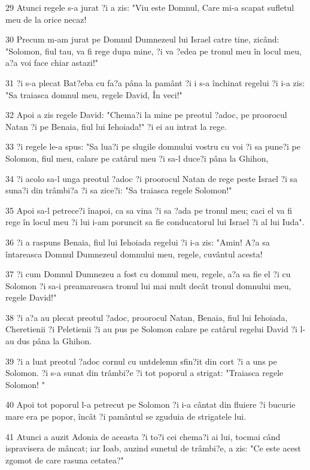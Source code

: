 \par 29 Atunci regele s-a jurat ?i a zis: "Viu este Domnul, Care mi-a scapat sufletul meu de la orice necaz!
\par 30 Precum m-am jurat pe Domnul Dumnezeul lui Israel catre tine, zicând: "Solomon, fiul tau, va fi rege dupa mine, ?i va ?edea pe tronul meu în locul meu, a?a voi face chiar astazi!"
\par 31 ?i s-a plecat Bat?eba cu fa?a pâna la pamânt ?i i s-a închinat regelui ?i i-a zis: "Sa traiasca domnul meu, regele David, În veci!"
\par 32 Apoi a zis regele David: "Chema?i la mine pe preotul ?adoc, pe proorocul Natan ?i pe Benaia, fiul lui Iehoiada!" ?i ei au intrat la rege.
\par 33 ?i regele le-a spus: "Sa lua?i pe slugile domnului vostru cu voi ?i sa pune?i pe Solomon, fiul meu, calare pe catârul meu ?i sa-l duce?i pâna la Ghihon,
\par 34 ?i acolo sa-l unga preotul ?adoc ?i proorocul Natan de rege peste Israel ?i sa suna?i din trâmbi?a ?i sa zice?i: "Sa traiasca regele Solomon!"
\par 35 Apoi sa-l petrece?i înapoi, ca sa vina ?i sa ?ada pe tronul meu; caci el va fi rege în locul meu ?i lui i-am poruncit sa fie conducatorul lui Israel ?i al lui Iuda".
\par 36 ?i a raspuns Benaia, fiul lui Iehoiada regelui ?i i-a zis: "Amin! A?a sa întareasca Domnul Dumnezeul domnului meu, regele, cuvântul acesta!
\par 37 ?i cum Domnul Dumnezeu a fost cu domnul meu, regele, a?a sa fie el ?i cu Solomon ?i sa-i preamareasca tronul lui mai mult decât tronul domnului meu, regele David!"
\par 38 ?i a?a au plecat preotul ?adoc, proorocul Natan, Benaia, fiul lui Iehoiada, Cheretienii ?i Peletienii ?i au pus pe Solomon calare pe catârul regelui David ?i l-au dus pâna la Ghihon.
\par 39 ?i a luat preotul ?adoc cornul cu untdelemn sfin?it din cort ?i a uns pe Solomon. ?i s-a sunat din trâmbi?e ?i tot poporul a strigat: "Traiasca regele Solomon! "
\par 40 Apoi tot poporul l-a petrecut pe Solomon ?i i-a cântat din fluiere ?i bucurie mare era pe popor, încât ?i pamântul se zguduia de strigatele lui.
\par 41 Atunci a auzit Adonia de aceasta ?i to?i cei chema?i ai lui, tocmai când ispravisera de mâncat; iar Ioab, auzind sunetul de trâmbi?e, a zis: "Ce este acest zgomot de care rasuna cetatea?"
